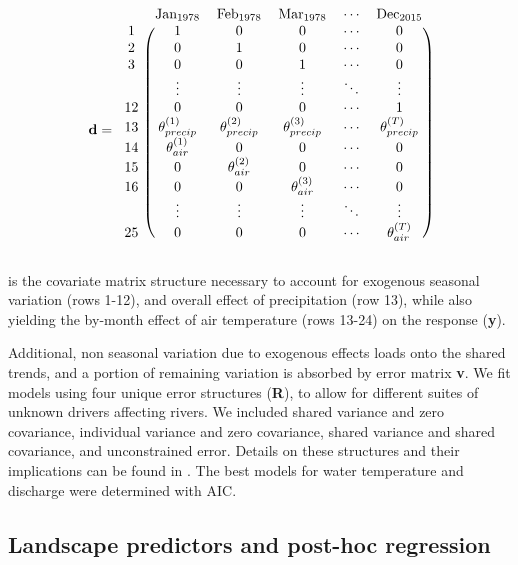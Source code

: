 \documentclass[notitlepage]{article}
\begin{document}
$$
\textbf{d} = \begin{blockarray}{cccccc}
& \textrm{Jan}_{1978} & \textrm{Feb}_{1978} & \textrm{Mar}_{1978} & \cdots & \textrm{Dec}_{2015} \\
\begin{block}{c(ccccc)}
    1 & 1 & 0 & 0 & \cdots & 0 \\
    2 & 0 & 1 & 0 & \cdots & 0 \\
    3 & 0 & 0 & 1 & \cdots & 0 \\
      & \vdots & \vdots & \vdots & \ddots & \vdots \\
    12 & 0 & 0 & 0 & \cdots & 1 \\
    13 & \theta_{precip}^{(1)} & \theta_{precip}^{(2)} & \theta_{precip}^{(3)} & \cdots & \theta_{precip}^{(T)} \\
    14 & \theta_{air}^{(1)} & 0 & 0 & \cdots & 0 \\
    15 & 0 & \theta_{air}^{(2)} & 0 & \cdots & 0 \\
    16 & 0 & 0 & \theta_{air}^{(3)} & \cdots & 0 \\
      & \vdots & \vdots & \vdots & \ddots & \vdots \\
    25 & 0 & 0 & 0 & \cdots & \theta_{air}^{(T)} \\
\end{block}
\end{blockarray}
$$

is the covariate matrix structure necessary to account for exogenous seasonal variation (rows 1-12), and overall effect of precipitation (row 13), while also yielding the by-month effect of air temperature (rows 13-24) on the response (\textbf{y}).

Additional, non seasonal variation due to exogenous effects loads onto the shared trends, and a portion of remaining variation is absorbed by error matrix \textbf{v}. We fit models using four unique error structures (\textbf{R}), to allow for different suites of unknown drivers affecting rivers. We included shared variance and zero covariance, individual variance and zero covariance, shared variance and shared covariance, and unconstrained error. Details on these structures and their implications can be found in \citep{holmes2012marss}. The best models for water temperature and discharge were determined with AIC.

\subsection*{Landscape predictors and post-hoc regression}
\end{document}
